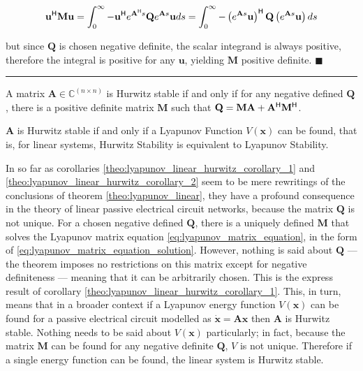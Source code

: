 \begin{equation} \mathbf{u}^{\mathsf{H}}\mathbf{M}\mathbf{u} = \int_0^\infty -\mathbf{u}^{\mathsf{H}} e^{\mathbf{A}^{\mathsf{H}} s}\mathbf{Q}e^{\mathbf{A} s} \mathbf{u} ds = \int_0^\infty -\left(e^{\mathbf{A} s} \mathbf{u}\right)^{\mathsf{H}} \mathbf{Q} \left(e^{\mathbf{A} s} \mathbf{u}\right) ds \end{equation}

	\noindent but since $\mathbf{Q}$ is chosen negative definite, the scalar integrand is always positive, therefore the integral is positive for any $\mathbf{u}$, yielding $\mathbf{M}$ positive definite.
\hfill$\blacksquare$
\vspace{5mm}
\hrule
\vspace{5mm} %

\begin{corollary} \label{theo:lyapunov_linear_hurwitz_corollary_1} %
	A matrix $\mathbf{A}\in\mathbb{C}^{(n\times n)}$ is Hurwitz stable if and only if for any negative defined $\mathbf{Q}$, there is a positive definite matrix $\mathbf{M}$ such that $\mathbf{Q} = \mathbf{M} \mathbf{A} + \mathbf{A}^{\mathsf{H}}\mathbf{M}^{\mathsf{H}}$.
\end{corollary} %

\begin{corollary} \label{theo:lyapunov_linear_hurwitz_corollary_2} %
	$\mathbf{A}$ is Hurwitz stable if and only if a Lyapunov Function $V\left(\mathbf{x}\right)$ can be found, that is, for linear systems, Hurwitz Stability is equivalent to Lyapunov Stability.
\end{corollary} %

	In so far as corollaries \ref{theo:lyapunov_linear_hurwitz_corollary_1} and \ref{theo:lyapunov_linear_hurwitz_corollary_2} seem to be mere rewritings of the conclusions of theorem \ref{theo:lyapunov_linear}, they have a profound consequence in the theory of linear passive electrical circuit networks, because the matrix $\mathbf{Q}$ is not unique. For a chosen negative defined $\mathbf{Q}$, there is a uniquely defined $\mathbf{M}$ that solves the Lyapunov matrix equation \eqref{eq:lyapunov_matrix_equation}, in the form of \eqref{eq:lyapunov_matrix_equation_solution}. However, nothing is said about $\mathbf{Q}$ — the theorem imposes no restrictions on this matrix except for negative definiteness — meaning that it can be arbitrarily chosen. This is the express result of corollary \ref{theo:lyapunov_linear_hurwitz_corollary_1}. This, in turn, means that in a broader context if a Lyapunov energy function $V\left(\mathbf{x}\right)$ can be found for a passive electrical circuit modelled as $\dot{\mathbf{x}} = \mathbf{Ax}$ then $\mathbf{A}$ is Hurwitz stable. Nothing needs to be said about $V\left(\mathbf{x}\right)$ particularly; in fact, because the matrix $\mathbf{M}$ can be found for any negative definite $\mathbf{Q}$, $V$ is not unique. Therefore if a single energy function can be found, the linear system is Hurwitz stable.

